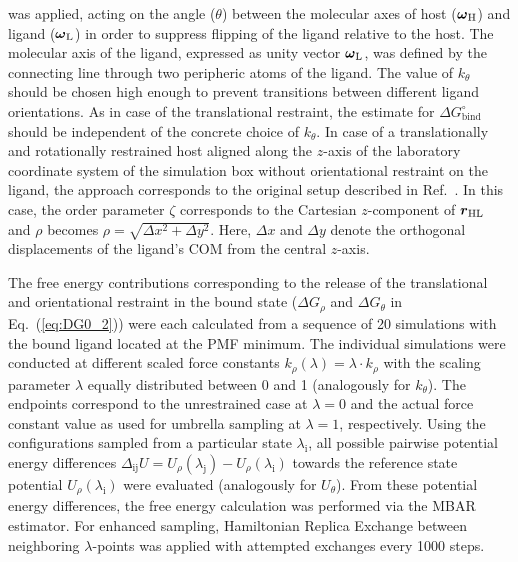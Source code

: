 \documentclass[9pt,lessons,pubversion]{livecoms}
\begin{document}
was applied, acting on the angle ($\theta$) between the molecular axes of host ($\text{\boldmath$\omega$}_\mathrm{H}$) and 
ligand ($\text{\boldmath$\omega$}_\mathrm{L}$) in order to suppress flipping of the ligand relative to the host.
The molecular axis of the ligand, expressed as unity vector $\text{\boldmath$\omega$}_\mathrm{L}$, was defined by the connecting line through two peripheric atoms of the ligand.
The value of $k_\theta$ should be chosen high enough to prevent transitions between different ligand orientations. 
As in case of the translational restraint, the estimate for $\Delta G^\circ_\mathrm{bind}$ should be independent of the concrete choice of $k_\theta$.
In case of a translationally and rotationally restrained host aligned along the $z$-axis of the laboratory coordinate system of the simulation box without orientational restraint on the ligand, the approach corresponds to the original setup described in Ref.~.
In this case, the order parameter $\zeta$ corresponds to the Cartesian $z$-component of $\text{\boldmath $r$}_\mathrm{HL}$ and $\rho$ becomes $\rho = \sqrt{\Delta x^2 + \Delta y^2}$.
Here, $\Delta x$ and $\Delta y$ denote the orthogonal displacements of the ligand's COM from the central $z$-axis.

The free energy contributions corresponding to the release of the translational and orientational restraint in the bound state ($\Delta G_\rho$ and $\Delta G_\theta$ in Eq.~(\ref{eq:DG0_2})) 
were each calculated from a sequence of 20 simulations with the bound ligand located at the PMF minimum. 
The individual simulations were conducted at different scaled force constants $k_\rho(\lambda) = \lambda \cdot k_\rho$ with the scaling parameter $\lambda$ equally distributed between 0 and 1 (analogously for $k_\theta$).  
The endpoints correspond to the unrestrained case at $\lambda = 0$ and the actual force constant value as used for umbrella sampling at $\lambda = 1$, respectively.
Using the configurations sampled from a particular state $\lambda_\mathrm{i}$, all possible pairwise potential energy differences $\Delta_\mathrm{ij} U = U_\rho(\lambda_\mathrm{j}) - U_\rho(\lambda_\mathrm{i})$ 
towards the reference state potential $U_\rho(\lambda_\mathrm{i})$ were evaluated (analogously for $U_\theta$). 
From these potential energy differences, the free energy calculation was performed via the MBAR estimator. 
For enhanced sampling, Hamiltonian Replica Exchange between neighboring $\lambda$-points was applied with attempted exchanges every 1000 steps. 
\end{document}
